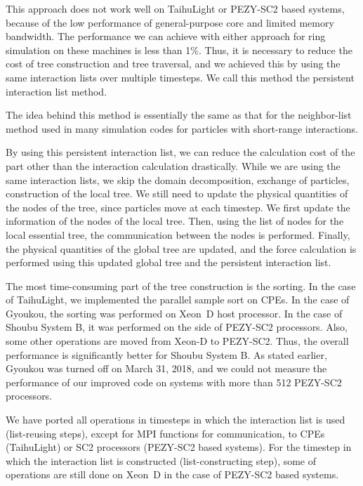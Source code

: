 \documentclass[conference]{IEEEtran}
\begin{document}
This approach does not work well on TaihuLight or PEZY-SC2 based systems, because of
the low performance of general-purpose core and limited memory bandwidth. 
The
performance we can achieve with either approach for ring simulation on
these machines is less than 1\%.
Thus, it is necessary to reduce the cost of tree construction and tree
traversal, and we achieved this by using the same interaction lists
over multiple timesteps. We call this method the persistent
interaction list method.

The idea behind this method is essentially the same as that for
the  neighbor-list method used in many simulation codes for particles
with short-range  interactions. 

By using this persistent interaction list, we can reduce the
calculation cost of the part other than the interaction calculation
drastically. While we are using the same interaction lists, we skip the
domain decomposition, exchange of particles, construction of the local
tree. We still need to update the physical quantities of the nodes of
the tree, since particles move at each timestep.
We first update the information of the nodes of
the local tree. Then,
using the list of nodes for the local essential tree, the
communication between the nodes is performed. Finally, the physical
quantities of the global tree are updated, and the force calculation is
performed using this updated global tree and the persistent
interaction list.

The most time-consuming part of the tree construction is the
sorting. In the case of TaihuLight, we implemented the parallel sample
sort\cite{cmsort} on CPEs. In the case of Gyoukou, the
sorting was performed on Xeon~D host processor. In the case of
Shoubu System B, it was performed on the side of PEZY-SC2
processors. Also, some other operations are moved from Xeon-D to
PEZY-SC2. Thus, the overall performance is significantly better for
Shoubu System B. As stated earlier, Gyoukou was turned off on March
31, 2018, and we could not measure the performance of our improved
code on systems with more than 512 PEZY-SC2 processors.

We have ported all operations in timesteps in which the interaction
list is used (list-reusing steps), except for MPI functions for
communication, to CPEs (TaihuLight) or SC2 processors (PEZY-SC2 based
systems).  For the timestep in which the interaction list is
constructed (list-constructing step), some of operations are still
done on Xeon~D in the case of PEZY-SC2 based systems.
\end{document}
